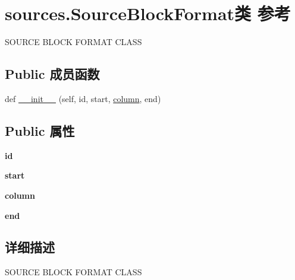 \hypertarget{classsources_1_1_source_block_format}{}\section{sources.\+Source\+Block\+Format类 参考}
\label{classsources_1_1_source_block_format}


S\+O\+U\+R\+CE B\+L\+O\+CK F\+O\+R\+M\+AT C\+L\+A\+SS  


\subsection*{Public 成员函数}
\begin{DoxyCompactItemize}
\item 
def \hyperlink{classsources_1_1_source_block_format_a764ff2b86029ec36449dcd7c4f3dca31}{\+\_\+\+\_\+init\+\_\+\+\_\+} (self, id, start, \hyperlink{structcolumn}{column}, end)
\end{DoxyCompactItemize}
\subsection*{Public 属性}
\begin{DoxyCompactItemize}
\item 
\mbox{\label{classsources_1_1_source_block_format_af9700293768e74faf9bda49cf407ff99}} 
{\bfseries id}
\item 
\mbox{\label{classsources_1_1_source_block_format_a645ae8bcdc09b14da5c35fbcb2adf043}} 
{\bfseries start}
\item 
\mbox{\label{classsources_1_1_source_block_format_ae5bb9e416f6280d4e57557abffc87f0d}} 
{\bfseries column}
\item 
\mbox{\label{classsources_1_1_source_block_format_a1bec2ffda05f5947540b8b5005e99f27}} 
{\bfseries end}
\end{DoxyCompactItemize}


\subsection{详细描述}
S\+O\+U\+R\+CE B\+L\+O\+CK F\+O\+R\+M\+AT C\+L\+A\+SS 

